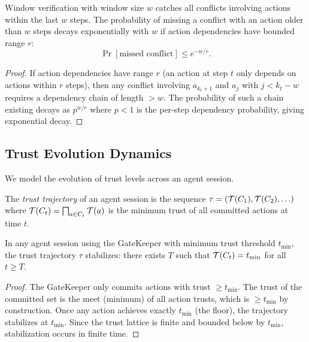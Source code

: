 \documentclass[11pt]{article}
\begin{document}
\begin{proposition}\label{prop:window}
Window verification with window size $w$ catches all conflicts
involving actions within the last $w$ steps.  The probability of
missing a conflict with an action older than $w$ steps decays
exponentially with $w$ if action dependencies have bounded range $r$:
\[
  \Pr[\text{missed conflict}] \leq e^{-w/r}.
\]
\end{proposition}

\begin{proof}
If action dependencies have range $r$ (an action at step $t$ only
depends on actions within $r$ steps), then any conflict involving
$a_{k_t+1}$ and $a_j$ with $j < k_t - w$ requires a dependency
chain of length $> w$.  The probability of such a chain existing
decays as $p^{w/r}$ where $p < 1$ is the per-step dependency
probability, giving exponential decay.
\end{proof}

\subsection{Trust Evolution Dynamics}\label{subsec:trust-dynamics}

We model the evolution of trust levels across an agent session.

\begin{definition}\label{def:trust-trajectory}
The \emph{trust trajectory} of an agent session is the sequence
$\tau = (\mathcal{T}(C_1), \mathcal{T}(C_2), \ldots)$ where
$\mathcal{T}(C_t) = \bigsqcap_{a \in C_t} \mathcal{T}(a)$ is the minimum
trust of all committed actions at time $t$.
\end{definition}

\begin{theorem}\label{thm:trust-stabilize}
In any agent session using the GateKeeper with minimum trust threshold
$t_{\min}$, the trust trajectory $\tau$ stabilizes: there exists
$T$ such that $\mathcal{T}(C_t) = t_{\min}$ for all $t \geq T$.
\end{theorem}

\begin{proof}
The GateKeeper only commits actions with trust $\geq t_{\min}$.
The trust of the committed set is the meet (minimum) of all action
trusts, which is $\geq t_{\min}$ by construction.  Once any action
achieves exactly $t_{\min}$ (the floor), the trajectory stabilizes
at $t_{\min}$.  Since the trust lattice is finite and bounded below
by $t_{\min}$, stabilization occurs in finite time.
\end{proof}
\end{document}
